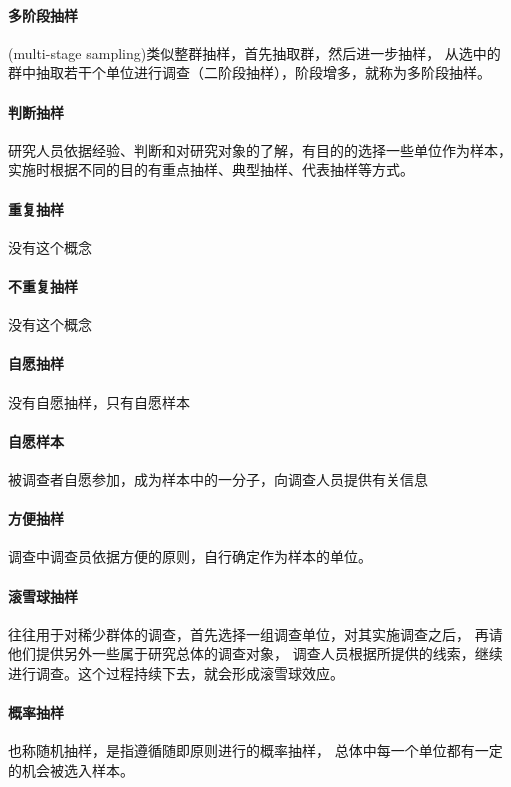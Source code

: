 \documentclass[UTF8,10pt]{book}
\begin{document}
        \paragraph{多阶段抽样}
            (multi-stage sampling)类似整群抽样，首先抽取群，然后进一步抽样，
            从选中的群中抽取若干个单位进行调查（二阶段抽样），阶段增多，就称为多阶段抽样。
        \paragraph{判断抽样}
            研究人员依据经验、判断和对研究对象的了解，有目的的选择一些单位作为样本，
            实施时根据不同的目的有重点抽样、典型抽样、代表抽样等方式。
        \paragraph{重复抽样} 没有这个概念
        \paragraph{不重复抽样} 没有这个概念
        \paragraph{自愿抽样} 没有自愿抽样，只有自愿样本
        \paragraph{自愿样本}
            被调查者自愿参加，成为样本中的一分子，向调查人员提供有关信息
        \paragraph{方便抽样}
            调查中调查员依据方便的原则，自行确定作为样本的单位。
        \paragraph{滚雪球抽样}
            往往用于对稀少群体的调查，首先选择一组调查单位，对其实施调查之后，
            再请他们提供另外一些属于研究总体的调查对象，
            调查人员根据所提供的线索，继续进行调查。这个过程持续下去，就会形成滚雪球效应。
        \paragraph{概率抽样} 
            也称随机抽样，是指遵循随即原则进行的概率抽样，
            总体中每一个单位都有一定的机会被选入样本。
            
\end{document}

